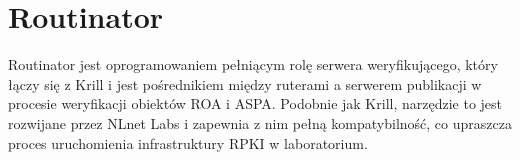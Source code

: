 \section{Routinator}

Routinator jest oprogramowaniem pełniącym rolę serwera weryfikującego, który łączy się z Krill i jest pośrednikiem między ruterami a serwerem publikacji w procesie weryfikacji obiektów ROA i ASPA. Podobnie jak Krill, narzędzie to jest rozwijane przez NLnet Labs i zapewnia z nim pełną kompatybilność, co upraszcza proces uruchomienia infrastruktury RPKI w laboratorium. 
